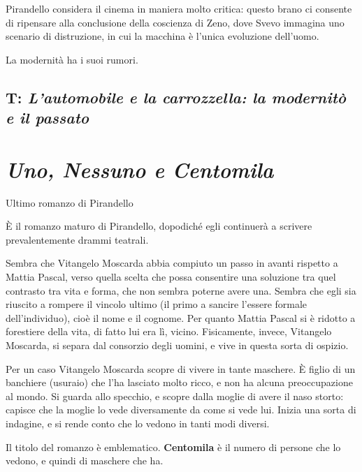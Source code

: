
Pirandello considera il cinema in maniera molto critica: questo brano ci consente di ripensare alla conclusione della coscienza di Zeno, dove Svevo immagina uno scenario di distruzione, in cui la macchina è l’unica evoluzione dell’uomo.

La modernità ha i suoi rumori.

\section{T: \textit{L'automobile e la carrozzella: la modernitò e il passato}}



\chapter{\textit{Uno, Nessuno e Centomila}}

Ultimo romanzo di Pirandello

È il romanzo maturo di Pirandello, dopodiché egli continuerà a scrivere prevalentemente drammi teatrali.

Sembra che Vitangelo Moscarda abbia compiuto un passo in avanti rispetto a Mattia Pascal, verso quella scelta che possa consentire una soluzione tra quel contrasto tra vita e forma, che non sembra poterne avere una.
Sembra che egli sia riuscito a rompere il vincolo ultimo (il primo a sancire l’essere formale dell’individuo), cioè il nome e il cognome.
Per quanto Mattia Pascal si è ridotto a forestiere della vita, di fatto lui era lì, vicino.
Fisicamente, invece, Vitangelo Moscarda, si separa dal consorzio degli uomini, e vive in questa sorta di ospizio.

Per un caso Vitangelo Moscarda scopre di vivere in tante maschere. È figlio di un banchiere (usuraio) che l’ha lasciato molto ricco, e non ha alcuna preoccupazione al mondo.
Si guarda allo specchio, e scopre dalla moglie di avere il naso storto: capisce che la moglie lo vede diversamente da come si vede lui.
Inizia una sorta di indagine, e si rende conto che lo vedono in tanti modi diversi.

Il titolo del romanzo è emblematico. \textbf{Centomila} è il numero di persone che lo vedono, e quindi di maschere che ha.

